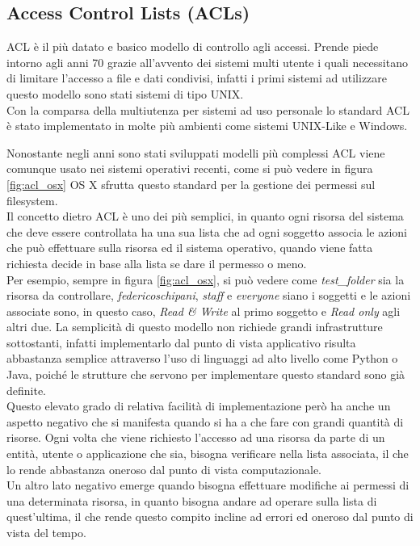 \subsection{Access Control Lists (ACLs)}
\label{sub:ACL}

ACL è il più datato e basico modello di controllo agli accessi. Prende piede intorno agli anni 70
grazie all'avvento dei sistemi multi utente i quali necessitano di limitare l'accesso a file e dati condivisi, infatti i primi sistemi ad utilizzare questo modello sono stati sistemi di tipo UNIX.\\
Con la comparsa della multiutenza per sistemi ad uso personale lo standard ACL è stato implementato in molte più ambienti come sistemi UNIX-Like e Windows.

Nonostante negli anni sono stati sviluppati modelli più complessi ACL viene comunque usato nei sistemi operativi recenti, come si può vedere in figura \ref{fig:acl_osx} OS X sfrutta questo standard per la gestione dei permessi sul filesystem.\\
Il concetto dietro ACL è uno dei più semplici, in quanto ogni risorsa del sistema che deve essere controllata ha una sua lista che ad ogni soggetto associa le azioni che può effettuare sulla risorsa ed il sistema operativo, quando viene fatta richiesta decide in base alla lista se dare il permesso o meno.\\
Per esempio, sempre in figura \ref{fig:acl_osx}, si può vedere come \textit{test\_folder} sia la risorsa da controllare, \textit{federicoschipani}, \textit{staff} e \textit{everyone} siano i soggetti e le azioni associate sono, in questo caso, \textit{Read \& Write} al primo soggetto e \textit{Read only} agli altri due.
La semplicità di questo modello non richiede grandi infrastrutture sottostanti, infatti implementarlo dal punto di vista applicativo risulta abbastanza semplice attraverso l'uso di linguaggi ad alto livello come Python o Java, poiché le strutture che servono per implementare questo standard sono già definite.\\
Questo elevato grado di relativa facilità di implementazione però ha anche un aspetto negativo che si manifesta quando si ha a che fare con grandi quantità di risorse. Ogni volta che viene richiesto l'accesso ad una risorsa da parte di un entità, utente o applicazione che sia, bisogna verificare nella lista associata, il che lo rende abbastanza oneroso dal punto di vista computazionale.\\
Un altro lato negativo emerge quando bisogna effettuare modifiche ai permessi di una determinata risorsa, in quanto bisogna andare ad operare sulla lista di quest'ultima, il che rende questo compito incline ad errori ed oneroso dal punto di vista del tempo.


